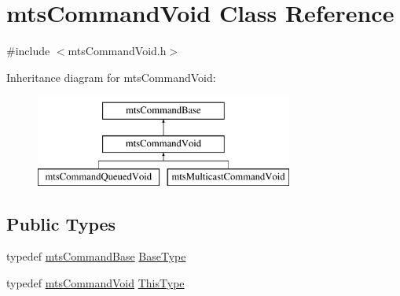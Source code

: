 \hypertarget{classmts_command_void}{\section{mts\-Command\-Void Class Reference}
\label{classmts_command_void}
}


{\ttfamily \#include $<$mts\-Command\-Void.\-h$>$}

Inheritance diagram for mts\-Command\-Void\-:\begin{figure}[H]
\begin{center}
\leavevmode
\includegraphics[height=3.000000cm]{db/d74/classmts_command_void}
\end{center}
\end{figure}
\subsection*{Public Types}
\begin{DoxyCompactItemize}
\item 
typedef \hyperlink{classmts_command_base}{mts\-Command\-Base} \hyperlink{classmts_command_void_aa0e2be86c520aef7b9c3a59e3cfbbce3}{Base\-Type}
\item 
typedef \hyperlink{classmts_command_void}{mts\-Command\-Void} \hyperlink{classmts_command_void_ae909e0b365485d0923193cec9331f8ce}{This\-Type}
\end{DoxyCompactItemize}
